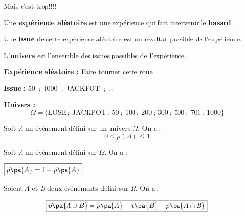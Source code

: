 Mais c'est trop!!!!


Une \textbf{expérience aléatoire} est une expérience qui fait intervenir le \textbf{hasard}.

Une \textbf{issue} de cette expérience aléatoire est un résultat possible de l'expérience.

L'\textbf{univers} est l'ensemble des issues possibles de l'expérience.

\ex
\bi
\item \textbf{Expérience aléatoire : } \og{} Faire tourner cette roue \fg{}
\item \textbf{Issue : } \og{} $50$\ ;\ $1000$\ ;\ JACKPOT\ ;\ \ldots \fg{}
\item \textbf{Univers : } $$\Omega = \lbrace \text{LOSE} \ ;\ \text{JACKPOT} \ ;\ 50 \ ;\ 100 \ ;\ 200 \ ;\ 300 \ ;\ 500 \ ;\ 700 \ ;\ 1000 \rbrace$$
\ei

\prop

Soit $A$ un événement défini sur un univers $\Omega$. On a : $$\boxed{0\le p(A) \le 1}$$

\prop

Soit $A$ un événement défini sur $\Omega$. On a :

\begin{center}$\boxed{p\pa{\bar{A}}=1-p\pa{A}}$\end{center}

\prop

Soient $A$ et $B$ deux événements défini sur $\Omega$. On a :

$$\boxed{p\pa{A\cup B}=p\pa{A}+p\pa{B}-p\pa{A\cap B}}$$




























